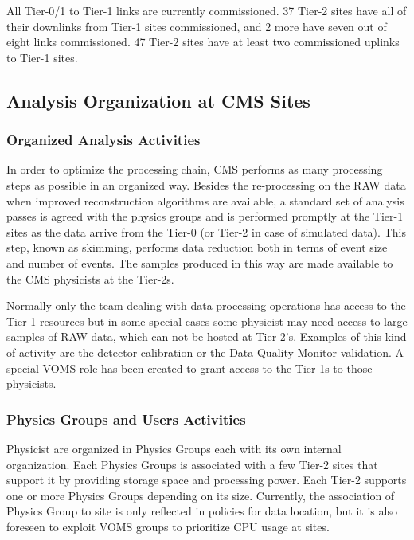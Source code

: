 All Tier-0/1 to Tier-1 links are currently commissioned. 37 Tier-2 sites have
all of their downlinks from Tier-1 sites commissioned, and 2 more have seven out
of eight links commissioned. 47 Tier-2 sites have at least two commissioned
uplinks to Tier-1 sites.

\subsection{Analysis Organization at CMS Sites}
\label{sec:4_3}
\subsubsection{ Organized Analysis Activities }
\label{sec:4_3_1}
In order to optimize the processing chain, CMS performs as many processing
steps as possible in an organized way. 
Besides the re-processing %
on the RAW data when improved reconstruction algorithms are available,
a standard set of analysis passes is agreed with the physics groups
and is performed promptly at the Tier-1 sites 
as the data arrive from the Tier-0 (or Tier-2 in case of simulated data). 
This step, known as skimming, performs data reduction both
in terms of event size and number of events. 
The samples produced in this way are made available
to the CMS physicists at the Tier-2s. %

Normally only the team dealing with data processing operations %
has access to the Tier-1 resources but in some special cases
some physicist may need access to large samples of RAW data,
which can not be hosted at Tier-2's.
Examples of this kind of activity are the detector 
calibration or the Data Quality Monitor validation.
A special VOMS role has been created to grant access
to the Tier-1s to those physicists. 

\subsubsection{Physics Groups and Users Activities}
\label{sec:4_3_2}
Physicist are organized in Physics Groups each with its own internal 
organization.
Each Physics Groups is associated with a few Tier-2 sites that support it by 
providing storage space and processing power.
Each Tier-2 supports one or more Physics Groups depending on its size.
Currently, the association of Physics Group to site is only reflected in policies for data location, but it is also foreseen to exploit VOMS groups to prioritize CPU usage at sites.

